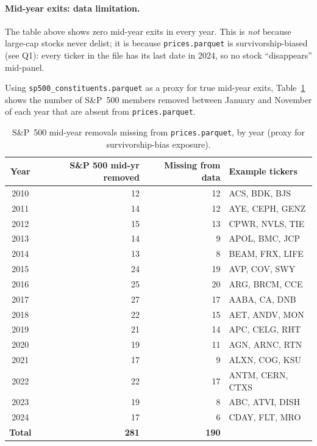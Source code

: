 \documentclass[12pt,a4paper]{article}
\begin{document}
\paragraph{Mid-year exits: data limitation.}
The table above shows zero mid-year exits in every year.
This is \emph{not} because large-cap stocks never delist; it is because
\texttt{prices.parquet} is survivorship-biased (see Q1): every ticker in the
file has its last date in 2024, so no stock ``disappears'' mid-panel.

Using \texttt{sp500\_constituents.parquet} as a proxy for true mid-year exits,
Table~\ref{tab:survivorship} shows the number of S\&P~500 members removed
between January and November of each year that are absent from
\texttt{prices.parquet}.

\begin{table}[H]
\centering
\caption{S\&P~500 mid-year removals missing from \texttt{prices.parquet},
         by year (proxy for survivorship-bias exposure).}
\label{tab:survivorship}
\begin{tabular}{crrl}
\toprule
Year & S\&P 500 mid-yr removed & Missing from data & Example tickers \\
\midrule
2010 & 12 & 12 & ACS, BDK, BJS \\
2011 & 14 & 12 & AYE, CEPH, GENZ \\
2012 & 15 & 13 & CPWR, NVLS, TIE \\
2013 & 14 &  9 & APOL, BMC, JCP \\
2014 & 13 &  8 & BEAM, FRX, LIFE \\
2015 & 24 & 19 & AVP, COV, SWY \\
2016 & 25 & 20 & ARG, BRCM, CCE \\
2017 & 27 & 17 & AABA, CA, DNB \\
2018 & 22 & 15 & AET, ANDV, MON \\
2019 & 21 & 14 & APC, CELG, RHT \\
2020 & 19 & 11 & AGN, ARNC, RTN \\
2021 & 17 &  9 & ALXN, COG, KSU \\
2022 & 22 & 17 & ANTM, CERN, CTXS \\
2023 & 19 &  8 & ABC, ATVI, DISH \\
2024 & 17 &  6 & CDAY, FLT, MRO \\
\midrule
\textbf{Total} & \textbf{281} & \textbf{190} & \\
\bottomrule
\end{tabular}
\end{table}
\end{document}
